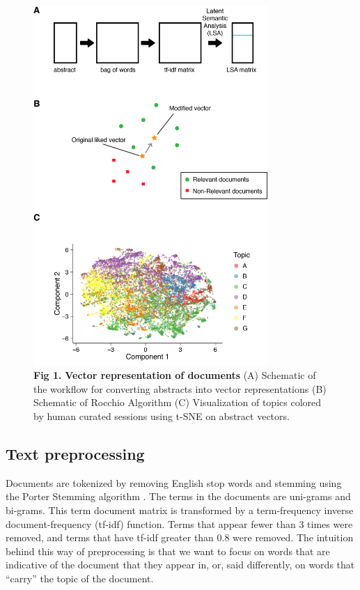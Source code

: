 \documentclass[a4paper]{article}
\begin{document}
\begin{figure}[!ht]
\centering
\includegraphics[width=3.5in]{algorithm_flow}
\caption*{\textbf{Fig 1.} \textbf{Vector representation of documents} (A) Schematic of the workflow for converting abstracts into vector representations (B) Schematic of Rocchio Algorithm (C) Visualization of topics colored by human curated sessions using t-SNE on abstract vectors.}
\end{figure}


\subsection{Text preprocessing}

Documents are tokenized by removing English stop words and stemming using the Porter Stemming algorithm \cite{porter1980algorithm}. The terms in the documents are uni-grams and bi-grams. This term document matrix is transformed by a term-frequency inverse document-frequency (tf-idf) function. Terms that appear fewer than 3 times were removed, and terms that have tf-idf greater than 0.8 were removed. The intuition behind this way of preprocessing is that we want to focus on words that are indicative of the document that they appear in, or, said differently, on words that “carry” the topic of the document.
\end{document}
